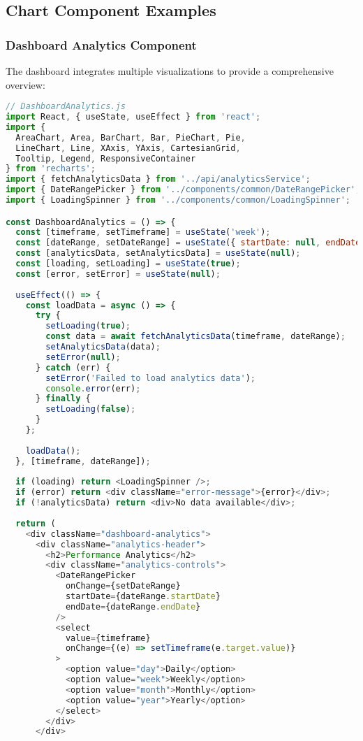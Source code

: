 \documentclass[12pt,a4paper]{article}
\begin{document}
\subsection{Chart Component Examples}

\subsubsection{Dashboard Analytics Component}
The dashboard integrates multiple visualizations to provide a comprehensive overview:

\begin{lstlisting}[language=JavaScript]
// DashboardAnalytics.js
import React, { useState, useEffect } from 'react';
import { 
  AreaChart, Area, BarChart, Bar, PieChart, Pie, 
  LineChart, Line, XAxis, YAxis, CartesianGrid, 
  Tooltip, Legend, ResponsiveContainer 
} from 'recharts';
import { fetchAnalyticsData } from '../api/analyticsService';
import { DateRangePicker } from '../components/common/DateRangePicker';
import { LoadingSpinner } from '../components/common/LoadingSpinner';

const DashboardAnalytics = () => {
  const [timeframe, setTimeframe] = useState('week');
  const [dateRange, setDateRange] = useState({ startDate: null, endDate: null });
  const [analyticsData, setAnalyticsData] = useState(null);
  const [loading, setLoading] = useState(true);
  const [error, setError] = useState(null);
  
  useEffect(() => {
    const loadData = async () => {
      try {
        setLoading(true);
        const data = await fetchAnalyticsData(timeframe, dateRange);
        setAnalyticsData(data);
        setError(null);
      } catch (err) {
        setError('Failed to load analytics data');
        console.error(err);
      } finally {
        setLoading(false);
      }
    };
    
    loadData();
  }, [timeframe, dateRange]);
  
  if (loading) return <LoadingSpinner />;
  if (error) return <div className="error-message">{error}</div>;
  if (!analyticsData) return <div>No data available</div>;
  
  return (
    <div className="dashboard-analytics">
      <div className="analytics-header">
        <h2>Performance Analytics</h2>
        <div className="analytics-controls">
          <DateRangePicker 
            onChange={setDateRange} 
            startDate={dateRange.startDate} 
            endDate={dateRange.endDate} 
          />
          <select 
            value={timeframe} 
            onChange={(e) => setTimeframe(e.target.value)}
          >
            <option value="day">Daily</option>
            <option value="week">Weekly</option>
            <option value="month">Monthly</option>
            <option value="year">Yearly</option>
          </select>
        </div>
      </div>
      

\end{lstlisting}
\end{document}
